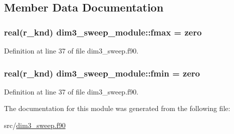 \subsection{Member Data Documentation}
\hypertarget{classdim3__sweep__module_aac295110595a9c85602d58906d51cd46}{
\subsubsection[{fmax}]{\setlength{\rightskip}{0pt plus 5cm}real(r\-\_\-knd) dim3\-\_\-sweep\-\_\-module\-::fmax = zero}}\label{classdim3__sweep__module_aac295110595a9c85602d58906d51cd46}


Definition at line 37 of file dim3\-\_\-sweep.\-f90.

\hypertarget{classdim3__sweep__module_a5ec448e8a99070a51d62e75a430a9c60}{
\subsubsection[{fmin}]{\setlength{\rightskip}{0pt plus 5cm}real(r\-\_\-knd) dim3\-\_\-sweep\-\_\-module\-::fmin = zero}}\label{classdim3__sweep__module_a5ec448e8a99070a51d62e75a430a9c60}


Definition at line 37 of file dim3\-\_\-sweep.\-f90.



The documentation for this module was generated from the following file\-:\begin{DoxyCompactItemize}
\item 
src/\hyperlink{dim3__sweep_8f90}{dim3\-\_\-sweep.\-f90}\end{DoxyCompactItemize}
